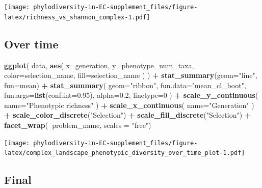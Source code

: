 \documentclass[]{book}
\newenvironment{Shaded}{\begin{snugshade}}{\end{snugshade}}
\newcommand{\DataTypeTok}[1]{\textcolor[rgb]{0.13,0.29,0.53}{#1}}
\newcommand{\DecValTok}[1]{\textcolor[rgb]{0.00,0.00,0.81}{#1}}
\newcommand{\FloatTok}[1]{\textcolor[rgb]{0.00,0.00,0.81}{#1}}
\newcommand{\KeywordTok}[1]{\textcolor[rgb]{0.13,0.29,0.53}{\textbf{#1}}}
\newcommand{\NormalTok}[1]{#1}
\newcommand{\OperatorTok}[1]{\textcolor[rgb]{0.81,0.36,0.00}{\textbf{#1}}}
\newcommand{\StringTok}[1]{\textcolor[rgb]{0.31,0.60,0.02}{#1}}
\begin{document}
\texttt{[image: phylodiversity-in-EC-supplement\_files/figure-latex/richness\_vs\_shannon\_complex-1.pdf]}

\hypertarget{over-time-5}{%
\subsection{Over time}\label{over-time-5}}

\begin{Shaded}
\begin{Highlighting}[]
\KeywordTok{ggplot}\NormalTok{(}
\NormalTok{    data,}
    \KeywordTok{aes}\NormalTok{(}
      \DataTypeTok{x=}\NormalTok{generation,}
      \DataTypeTok{y=}\NormalTok{phenotype_num_taxa,}
      \DataTypeTok{color=}\NormalTok{selection_name,}
      \DataTypeTok{fill=}\NormalTok{selection_name}
\NormalTok{    )}
\NormalTok{  ) }\OperatorTok{+}
\StringTok{  }\KeywordTok{stat_summary}\NormalTok{(}\DataTypeTok{geom=}\StringTok{"line"}\NormalTok{, }\DataTypeTok{fun=}\NormalTok{mean) }\OperatorTok{+}
\StringTok{  }\KeywordTok{stat_summary}\NormalTok{(}
    \DataTypeTok{geom=}\StringTok{"ribbon"}\NormalTok{,}
    \DataTypeTok{fun.data=}\StringTok{"mean_cl_boot"}\NormalTok{,}
    \DataTypeTok{fun.args=}\KeywordTok{list}\NormalTok{(}\DataTypeTok{conf.int=}\FloatTok{0.95}\NormalTok{),}
    \DataTypeTok{alpha=}\FloatTok{0.2}\NormalTok{,}
    \DataTypeTok{linetype=}\DecValTok{0}
\NormalTok{  ) }\OperatorTok{+}
\StringTok{  }\KeywordTok{scale_y_continuous}\NormalTok{(}
    \DataTypeTok{name=}\StringTok{"Phenotypic richness"}
\NormalTok{  ) }\OperatorTok{+}
\StringTok{  }\KeywordTok{scale_x_continuous}\NormalTok{(}
    \DataTypeTok{name=}\StringTok{"Generation"}
\NormalTok{  ) }\OperatorTok{+}
\StringTok{  }\KeywordTok{scale_color_discrete}\NormalTok{(}\StringTok{"Selection"}\NormalTok{) }\OperatorTok{+}\StringTok{ }
\StringTok{  }\KeywordTok{scale_fill_discrete}\NormalTok{(}\StringTok{"Selection"}\NormalTok{) }\OperatorTok{+}
\StringTok{  }\KeywordTok{facet_wrap}\NormalTok{(}\OperatorTok{~}\NormalTok{problem_name, }\DataTypeTok{scales =} \StringTok{"free"}\NormalTok{)}
\end{Highlighting}
\end{Shaded}

\texttt{[image: phylodiversity-in-EC-supplement\_files/figure-latex/complex\_landscape\_phenotypic\_diversity\_over\_time\_plot-1.pdf]}

\hypertarget{final-5}{%
\subsection{Final}\label{final-5}}
\end{document}
